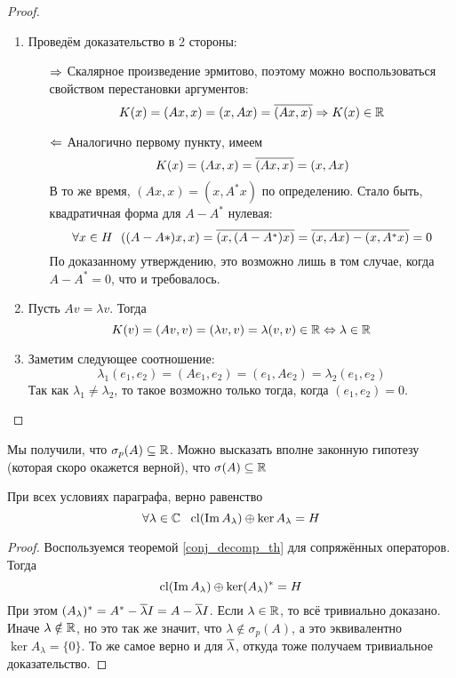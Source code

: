 \begin{proof}~
	\begin{enumerate}
		\item Проведём доказательство в 2 стороны:
		\begin{itemize}
			\item[$\Rightarrow$] Скалярное произведение эрмитово, поэтому можно воспользоваться свойством перестановки аргументов:
			\[
				K(x) = (Ax, x) = (x, Ax) = \overline{(Ax, x)} \Rightarrow K(x) \in \mathbb{R}
			\]
			
			\item[$\Leftarrow$] Аналогично первому пункту, имеем
			\[
				K(x) = (Ax, x) = \overline{(Ax, x)} = (x, Ax)
			\]
			В то же время, $(Ax, x) = (x, A^*x)$ по определению. Стало быть, квадратичная форма для $A - A^*$ нулевая:
			\[
				\forall x \in H\ \ ((A - A*)x, x) = \overline{(x, (A - A^*)x)} = \overline{(x, Ax) - (x, A^*x)} = 0
			\]
			По доказанному утверждению, это возможно лишь в том случае, когда $A - A^* = 0$, что и требовалось.
		\end{itemize}
		
		\item Пусть $Av = \lambda v$. Тогда
		\[
			K(v) = (Av, v) = (\lambda v, v) = \lambda (v, v) \in \mathbb{R} \Leftrightarrow \lambda \in \mathbb{R}
		\]
		
		\item Заметим следующее соотношение:
		\[
			\lambda_1(e_1, e_2) = (Ae_1, e_2) = (e_1, Ae_2) = \lambda_2(e_1, e_2)
		\]
		Так как $\lambda_1 \neq \lambda_2$, то такое возможно только тогда, когда $(e_1, e_2) = 0$.
	\end{enumerate}
\end{proof}

\begin{note}
	Мы получили, что $\sigma_p(A) \subseteq \mathbb{R}$. Можно высказать вполне законную гипотезу (которая скоро окажется верной), что $\sigma(A) \subseteq \mathbb{R}$
\end{note}

\begin{theorem} \label{sao_fred_th}
	При всех условиях параграфа, верно равенство
	\[
		\forall \lambda \in \mathbb{C}\ \ \operatorname{cl}(\operatorname{Im} A_\lambda) \oplus \ker A_\lambda = H
	\]
\end{theorem}

\begin{proof}
	Воспользуемся теоремой \ref{conj_decomp_th} для сопряжённых операторов. Тогда
	\[
		\operatorname{cl}(\operatorname{Im} A_\lambda) \oplus \ker (A_\lambda)^* = H
	\]
	При этом $(A_\lambda)^* = A^* - \overline{\lambda} I = A - \overline{\lambda} I$. Если $\lambda \in \mathbb{R}$, то всё тривиально доказано. Иначе $\lambda \notin \mathbb{R}$, но это так же значит, что $\lambda \notin \sigma_p(A)$, а это эквивалентно $\ker A_\lambda = \{0\}$. То же самое верно и для $\overline{\lambda}$, откуда тоже получаем тривиальное доказательство.
\end{proof}

